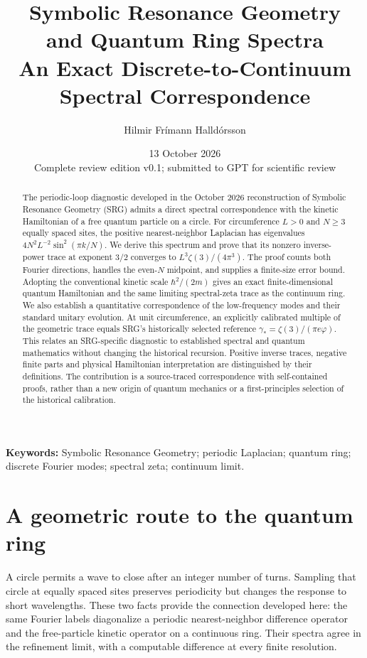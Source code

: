 \documentclass[11pt,a4paper]{article}
\title{\vspace{-12mm}\textbf{Symbolic Resonance Geometry\\and Quantum Ring Spectra}\\[5pt]
\large An Exact Discrete-to-Continuum Spectral Correspondence}
\author{Hilmir Fr\'imann Halld\'orsson}
\date{13 October 2026\\[3pt]\small Complete review edition v0.1; submitted to GPT for scientific review}
\theoremstyle{definition}\newtheorem{definition}[theorem]{Definition}
\theoremstyle{remark}\newtheorem{remark}[theorem]{Remark}
\numberwithin{equation}{section}
\begin{document}
\maketitle
\begin{abstract}
The periodic-loop diagnostic developed in the October 2026 reconstruction of
Symbolic Resonance Geometry (SRG) admits a direct spectral correspondence with
the kinetic Hamiltonian of a free quantum particle on a circle. For circumference
\(L>0\) and \(N\geq3\) equally spaced sites, the positive nearest-neighbor
Laplacian has eigenvalues
\(4N^2L^{-2}\sin^2(\pi k/N)\).
We derive this spectrum and prove that its nonzero inverse-power trace at
exponent \(3/2\) converges to \(L^3\zeta(3)/(4\pi^3)\).
The proof counts both Fourier directions, handles the even-\(N\) midpoint,
and supplies a finite-size error bound. Adopting the conventional kinetic
scale \(\hbar^2/(2m)\) gives an exact finite-dimensional quantum Hamiltonian
and the same limiting spectral-zeta trace as the continuum ring.
We also establish a quantitative correspondence of the low-frequency modes
and their standard unitary evolution. At unit circumference, an explicitly
calibrated multiple of the geometric trace equals SRG's historically selected
reference \(\gamma_*=\zeta(3)/(\pi e\varphi)\).
This relates an SRG-specific diagnostic to established spectral and quantum
mathematics without changing the historical recursion. Positive inverse traces,
negative finite parts and physical Hamiltonian interpretation are distinguished
by their definitions. The contribution is a source-traced correspondence with
self-contained proofs, rather than a new origin of quantum mechanics or a
first-principles selection of the historical calibration.
\end{abstract}
\noindent\textbf{Keywords:} Symbolic Resonance Geometry; periodic Laplacian;
quantum ring; discrete Fourier modes; spectral zeta; continuum limit.

\section{A geometric route to the quantum ring}\label{sec:intro}
A circle permits a wave to close after an integer number of turns. Sampling
that circle at equally spaced sites preserves periodicity but changes the
response to short wavelengths. These two facts provide the connection developed
here: the same Fourier labels diagonalize a periodic nearest-neighbor
difference operator and the free-particle kinetic operator on a continuous
ring. Their spectra agree in the refinement limit, with a computable
difference at every finite resolution.
\end{document}
